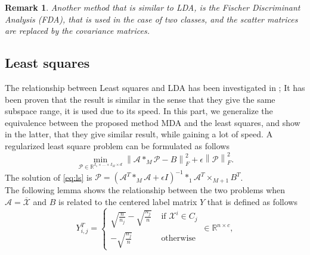 \documentclass{siamltex}
\newtheorem{remark}{Remark}
\begin{document}
\begin{remark}
Another method that is similar to LDA, is the Fischer Discriminant Analysis (FDA), that is used in the case of two classes, and the scatter matrices are replaced by the covariance matrices.
\end{remark}

\subsection{Least squares}
The relationship between Least squares and LDA has been investigated in \cite{lee2015equivalence}; It has been proven that the result is similar in the sense that they give the same subspace range, it is used due to its speed. In this part, we generalize the equivalence between the proposed method MDA and the least squares, and show in the latter, that they give similar result, while gaining a lot of speed. 
A regularized least square problem can be formulated as follows
\begin{equation} \label{eq:ls}
\min_{\mathcal{P} \in \mathbb{R}^{I_1 \times \ldots \times I_M \times d}} \left\| \mathcal{A} *_M \mathcal{P} - B\right\|_F^2 + \epsilon \left\| \mathcal{P}\right\|_F^2.
\end{equation}
The solution of \ref{eq:ls} is $\mathcal{P}=(\mathcal{A}^T *_M \mathcal{A} + \epsilon I)^{-1} *_1 \mathcal{A}^T \times_{M+1} B^T$.\\
The following lemma shows the relationship between the two problems when $\mathcal{A}=\overline{\mathcal{X}}$ and $B$ is related to the centered label matrix $Y$ that is defined as follows
\begin{equation*}
Y_{i,j}^T= \begin{cases}\sqrt{\frac{n}{n_j}}-\sqrt{\frac{n_j}{n}} & \text { if } \mathcal{X}^{i} \in C_j \\ -\sqrt{\frac{n_j}{n}} & \text { otherwise }\end{cases} \in \mathbb{R}^{n \times c},
\end{equation*}
\end{document}
